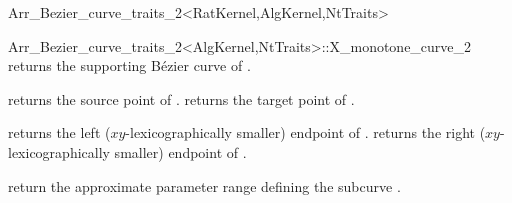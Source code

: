 \begin{ccRefClass}{Arr_Bezier_curve_traits_2<RatKernel,AlgKernel,NtTraits>}
\begin{ccClass}{Arr_Bezier_curve_traits_2<AlgKernel,NtTraits>::X_monotone_curve_2}
  {returns the supporting B\'ezier curve of \ccVar.}

  {returns the source point of \ccVar.}
\ccGlue
{}
  {returns the target point of \ccVar.}

  {returns the left ($xy$-lexicographically smaller) endpoint of \ccVar.}
\ccGlue
{}
  {returns the right ($xy$-lexicographically smaller) endpoint of \ccVar.}

  {return the approximate parameter range defining the subcurve \ccVar.}

\end{ccClass}

\end{ccRefClass}
\ccRefPageEnd
